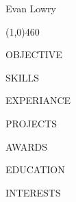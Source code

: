 \documentclass[10pt]{resume}
\begin{document}
{\LARGE Evan Lowry}
\begin{center}\line(1,0){460}\end{center}

{\LARGE OBJECTIVE}

{\LARGE SKILLS}

{\LARGE EXPERIANCE}

{\LARGE PROJECTS}

{\LARGE AWARDS}

{\LARGE EDUCATION}

{\LARGE INTERESTS}
\end{document}
